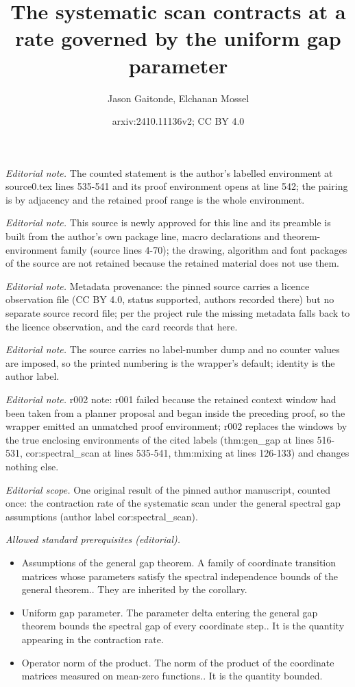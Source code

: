 \documentclass[10pt,a4paper]{article}
\title{The systematic scan contracts at a rate governed by the uniform gap parameter}
\author{Jason Gaitonde, Elchanan Mossel}
\date{arxiv:2410.11136v2; CC BY 4.0}
\begin{document}
\maketitle
\noindent\textit{Editorial note.} The counted statement is the author's labelled environment at source0.tex lines 535-541 and its proof environment opens at line 542; the pairing is by adjacency and the retained proof range is the whole environment.\par\medskip
\noindent\textit{Editorial note.} This source is newly approved for this line and its preamble is built from the author's own package line, macro declarations and theorem-environment family (source lines 4-70); the drawing, algorithm and font packages of the source are not retained because the retained material does not use them.\par\medskip
\noindent\textit{Editorial note.} Metadata provenance: the pinned source carries a licence observation file (CC BY 4.0, status supported, authors recorded there) but no separate source record file; per the project rule the missing metadata falls back to the licence observation, and the card records that here.\par\medskip
\noindent\textit{Editorial note.} The source carries no label-number dump and no counter values are imposed, so the printed numbering is the wrapper's default; identity is the author label.\par\medskip
\noindent\textit{Editorial note.} r002 note: r001 failed because the retained context window had been taken from a planner proposal and began inside the preceding proof, so the wrapper emitted an unmatched proof environment; r002 replaces the windows by the true enclosing environments of the cited labels (thm:gen\_gap at lines 516-531, cor:spectral\_scan at lines 535-541, thm:mixing at lines 126-133) and changes nothing else.\par\medskip
\noindent\textit{Editorial scope.} One original result of the pinned author manuscript, counted once: the contraction rate of the systematic scan under the general spectral gap assumptions (author label cor:spectral\_scan).\par\medskip
\noindent\textit{Allowed standard prerequisites (editorial).}\begin{itemize}
\item Assumptions of the general gap theorem. A family of coordinate transition matrices whose parameters satisfy the spectral independence bounds of the general theorem.. They are inherited by the corollary.
\item Uniform gap parameter. The parameter delta entering the general gap theorem bounds the spectral gap of every coordinate step.. It is the quantity appearing in the contraction rate.
\item Operator norm of the product. The norm of the product of the coordinate matrices measured on mean-zero functions.. It is the quantity bounded.
\end{itemize}\medskip
\end{document}
